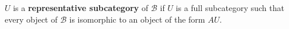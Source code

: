 $U$ is a \textbf{representative subcategory} of $\mathcal{B}$ if $U$ is a full subcategory such that every object of $\mathcal{B}$ is isomorphic to an object of the form $AU$.
